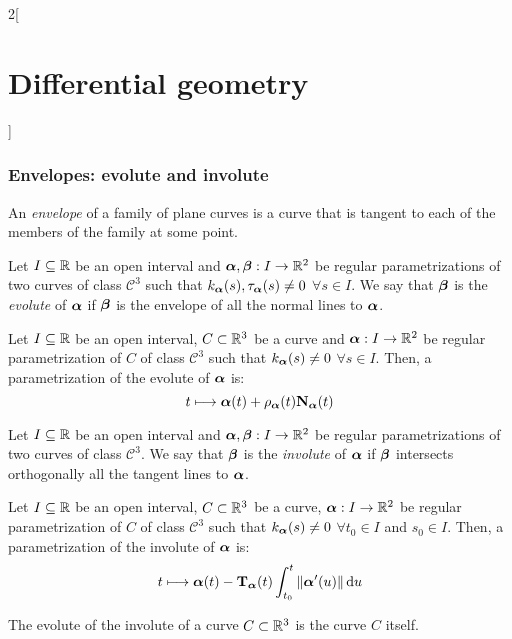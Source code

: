 \documentclass[../../../main_math.tex]{subfiles}
\begin{document}
\begin{multicols}{2}[\section{Differential geometry}]
  \subsubsection{Envelopes: evolute and involute}
  \begin{definition}
    An \emph{envelope} of a family of plane curves is a curve that is tangent to each of the members of the family at some point.
  \end{definition}
  \begin{definition}
    Let $I\subseteq\mathbb{R}$ be an open interval and $\boldsymbol{\mathrm{\alpha}},\boldsymbol{\mathrm{\beta}}:I\rightarrow\mathbb{R}^2$ be regular parametrizations of two curves of class $\mathcal{C}^3$ such that $k_{\boldsymbol{\mathrm{\alpha}}}(s),{\tau_{\boldsymbol{\mathrm{\alpha}}}}(s)\ne 0$ $\forall s\in I$. We say that $\boldsymbol{\mathrm{\beta}}$ is the \emph{evolute} of $\boldsymbol{\mathrm{\alpha}}$ if $\boldsymbol{\mathrm{\beta}}$ is the envelope of all the normal lines to $\boldsymbol{\mathrm{\alpha}}$.
  \end{definition}
  \begin{proposition}
    Let $I\subseteq\mathbb{R}$ be an open interval, $C\subset\mathbb{R}^3$ be a curve and $\boldsymbol{\mathrm{\alpha}}:I\rightarrow\mathbb{R}^2$ be regular parametrization of $C$ of class $\mathcal{C}^3$ such that $k_{\boldsymbol{\mathrm{\alpha}}}(s)\ne 0$ $\forall s\in I$. Then, a parametrization of the evolute of $\boldsymbol{\mathrm{\alpha}}$ is: $$t\longmapsto \boldsymbol{\mathrm{\alpha}}(t)+{\rho_{\boldsymbol{\mathrm{\alpha}}}}(t){\boldsymbol{\mathrm{N}}_{\boldsymbol{\mathrm{\alpha}}}}(t)$$
  \end{proposition}
  \begin{definition}
    Let $I\subseteq\mathbb{R}$ be an open interval and $\boldsymbol{\mathrm{\alpha}},\boldsymbol{\mathrm{\beta}}:I\rightarrow\mathbb{R}^2$ be regular parametrizations of two curves of class $\mathcal{C}^3$. We say that $\boldsymbol{\mathrm{\beta}}$ is the \emph{involute} of $\boldsymbol{\mathrm{\alpha}}$ if $\boldsymbol{\mathrm{\beta}}$ intersects orthogonally all the tangent lines to $\boldsymbol{\mathrm{\alpha}}$.
  \end{definition}
  \begin{proposition}
    Let $I\subseteq\mathbb{R}$ be an open interval, $C\subset\mathbb{R}^3$ be a curve, $\boldsymbol{\mathrm{\alpha}}:I\rightarrow\mathbb{R}^2$ be regular parametrization of $C$ of class $\mathcal{C}^3$ such that $k_{\boldsymbol{\mathrm{\alpha}}}(s)\ne 0$ $\forall t_0\in I$ and $s_0\in I$. Then, a parametrization of the involute of $\boldsymbol{\mathrm{\alpha}}$ is: $$t\longmapsto \boldsymbol{\mathrm{\alpha}}(t)-{\boldsymbol{\mathrm{T}}_{\boldsymbol{\mathrm{\alpha}}}}(t) \int_{t_0}^t\|\boldsymbol{\mathrm{\alpha}}'(u)\|\dd{u}$$
  \end{proposition}
  \begin{proposition}
    The evolute of the involute of a curve $C\subset\mathbb{R}^3$ is the curve $C$ itself.
  \end{proposition}
  \begin{center}
    \begin{minipage}{\linewidth}
      \centering
      
    \end{minipage}
  \end{center}

\end{multicols}
\end{document}
